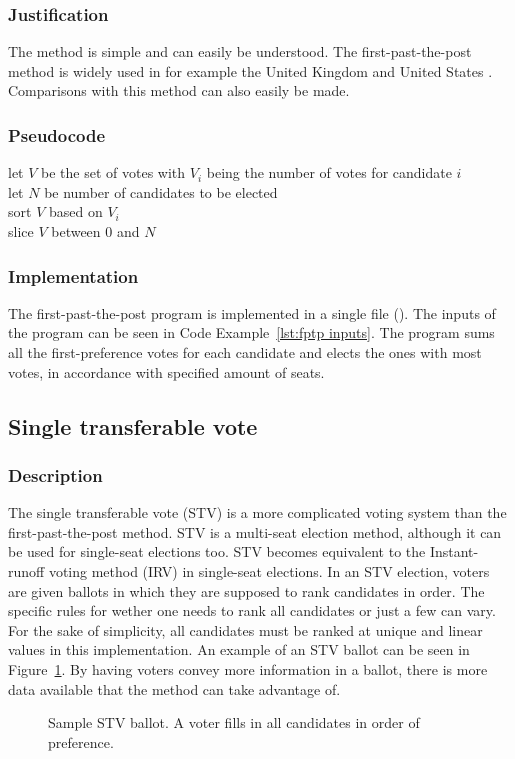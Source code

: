 \documentclass[12pt]{article}
\begin{document}
\subsubsection{Justification}
The method is simple and can easily be understood. The first-past-the-post method is widely used in for example the United Kingdom and United States \autocite{aceND}. Comparisons with this method can also easily be made.
\subsubsection{Pseudocode}
let $V$ be the set of votes with $V_{i}$ being the number of votes for candidate $i$ \\
let $N$ be number of candidates to be elected \\
sort $V$ based on $V_{i}$\\
slice $V$ between $0$ and $N$
\subsubsection{Implementation}
The first-past-the-post program is implemented in a single file (). The inputs of the program can be seen in Code Example~\ref{lst:fptp inputs}.
The program sums all the first-preference votes for each candidate and elects the ones with most votes, in accordance with specified amount of seats.
\subsection{Single transferable vote}
\subsubsection{Description}
The single transferable vote (STV) is a more complicated voting system than the first-past-the-post method. STV is a multi-seat election method, although it can be used for single-seat elections too. STV becomes equivalent to the Instant-runoff voting method (IRV) in single-seat elections. In an STV election, voters are given ballots in which they are supposed to rank candidates in order. The specific rules for wether one needs to rank all candidates or just a few can vary. For the sake of simplicity, all candidates must be ranked at unique and linear values in this implementation. An example of an STV ballot can be seen in Figure~\ref{fig:stv ballot}. By having voters convey more information in a ballot, there is more data available that the method can take advantage of. \autocite{electotal-reform-society2015}
\begin{figure}
	\centering
	
	\caption{Sample STV ballot. A voter fills in all candidates in order of preference.}
\label{fig:stv ballot}
\end{figure}
\end{document}
